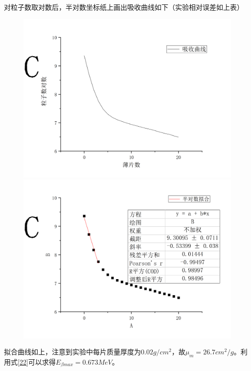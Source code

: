 \documentclass[hyperref]{ctexart}
\begin{document}
	对粒子数取对数后，半对数坐标纸上画出吸收曲线如下（实验相对误差如上表）
	\begin{figure}[H]
	\begin{minipage}{0.5\linewidth}
	\includegraphics[scale=0.3]{t11}
	\end{minipage}
	\begin{minipage}{0.25\linewidth}
	\includegraphics[scale=0.3]{t12}
	\end{minipage}
	\end{figure}
	拟合曲线如上，注意到实验中每片质量厚度为$0.02g/{cm}^2$，故$\mu_m = 26.7{cm}^2/g$。利用式\eqref{22}可以求得$E_{\beta max} = 0.673 MeV$。
\end{document}
